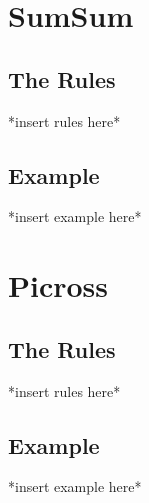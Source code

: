 \documentclass[12pt]{article}
\begin{document}
	\newpage
	
	\section*{SumSum}
	
	\subsection*{The Rules}
	
	*insert rules here*
	
	\subsection*{Example}
	
	*insert example here*
	
	\newpage
	
	\section*{Picross}
	
	\subsection*{The Rules}
	
	*insert rules here*
	
	\subsection*{Example}
	
	*insert example here*
		
\end{document}
